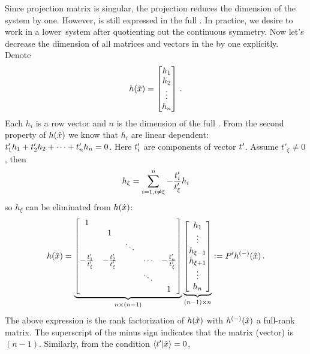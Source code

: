 Since projection matrix  is singular,
the projection
reduces the dimension of the system by one.
However,  is still expressed in
the full {\statesp}.
In practice,
we desire to work in a lower\dmn\ system after quotienting out
the continuous symmetry.
Now let's decrease the dimension of all matrices and
vectors in the {\slice} by one explicitly.
Denote
\[
  h(\hat{x})=
  \begin{bmatrix}
    h_{1} \\
    h_{2} \\
    \vdots \\
    h_{n}
  \end{bmatrix}
  \,.
\]
Each $h_{i}$ is a row vector and $n$ is the dimension of the full {\statesp}.
From the second property of $h(\hat{x})$ we know that $h_{i}$ are linear
dependent: $t'_{1}h_{1}+t'_{2}h_{2}+\cdots +t'_{n}h_{n}=0$.
Here $t'_{i}$ are
components of vector $t'_{}$.
Assume $t'_{\xi}\neq 0$, then
\[
h_{\xi}=\sum_{i=1,i\neq \xi}^{n}-\frac{t'_{i}}{t'_{\xi}}h_{i}
\]
so $h_{\xi}$ can be eliminated from $h(\hat{x})$:
\[
  h(\hat{x})=
  \underbrace{
    \begin{bmatrix}
      1 & & & & \\
      & 1 & & & \\
      & & \ddots & & \\
      -\frac{t'_{1}}{t'_{\xi}} &
      -\frac{t'_{2}}{t'_{\xi}} & & \cdots &
      -\frac{t'_{n}}{t'_{\xi}} \\
      & & & \ddots  & \\
      & & & & 1 \\
    \end{bmatrix}
  }_{n\times (n-1)}
  \underbrace{
    \begin{bmatrix}
      h_{1} \\
      \vdots \\
      h_{\xi-1} \\
      h_{\xi+1} \\
      \vdots \\
      h_{n} \\
    \end{bmatrix}
  }_{(n-1)\times n}
  := P'h^{(-)}(\hat{x})
  \,.
\]
The above expression is the {rank factorization}
of $h(\hat{x})$ with $h^{(-)}(\hat{x})$ a full-rank matrix.
The superscript of the minus sign indicates that
the matrix (vector) is $(n-1)$\dmn.
Similarly, from the {\slice} condition $\braket{\sliceTan{}}{\sspRed}=0$,
